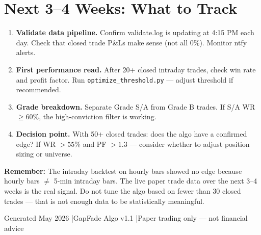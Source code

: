 \documentclass[11pt,a4paper]{article}
\begin{document}
\section{Next 3--4 Weeks: What to Track}

\begin{enumerate}[leftmargin=1.4em, label=\textbf{Week \arabic*:}]
  \item \textbf{Validate data pipeline.} Confirm validate.log is updating at 4:15 PM each day.
        Check that closed trade P\&Ls make sense (not all 0\%). Monitor ntfy alerts.
  \item \textbf{First performance read.} After 20+ closed intraday trades, check win rate and profit factor.
        Run \texttt{optimize\_threshold.py} --- adjust threshold if recommended.
  \item \textbf{Grade breakdown.} Separate Grade S/A from Grade B trades. If S/A WR $\geq 60\%$,
        the high-conviction filter is working.
  \item \textbf{Decision point.} With 50+ closed trades: does the algo have a confirmed edge?
        If WR $> 55\%$ and PF $> 1.3$ --- consider whether to adjust position sizing or universe.
\end{enumerate}

\vspace{4pt}
\begin{warnbox}
\textbf{Remember:} The intraday backtest on hourly bars showed no edge because hourly bars $\neq$ 5-min intraday bars.
The live paper trade data over the next 3--4 weeks is the real signal. Do not tune the algo
based on fewer than 30 closed trades --- that is not enough data to be statistically meaningful.
\end{warnbox}

\vspace{12pt}
\begin{center}
\color{darkgray}\small Generated May 2026 \quad|\quad GapFade Algo v1.1 \quad|\quad Paper trading only --- not financial advice
\end{center}
\end{document}
